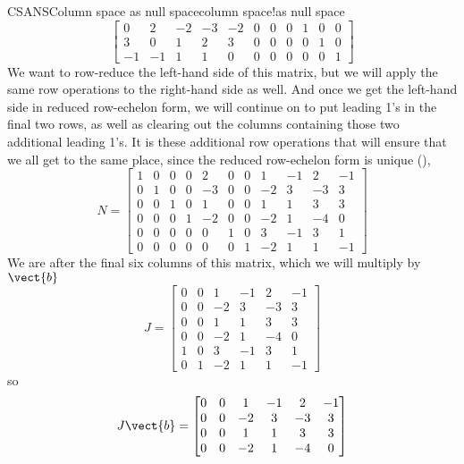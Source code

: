 \begin{example}{CSANS}{Column space as null space}{column space!as null space}
\begin{equation*}
\begin{bmatrix}
 0 & 2 & -2 & -3 & -2 & 0 & 0 & 0 & 1 & 0 & 0 \\
 3 & 0 & 1 & 2 & 3 & 0 & 0 & 0 & 0 & 1 & 0 \\
 -1 & -1 & 1 & 1 & 0 & 0 & 0 & 0 & 0 & 0 & 1
\end{bmatrix}
\end{equation*}
%
We want to row-reduce the left-hand side of this matrix, but we will apply the same row operations to the right-hand side as well.  And once we get the left-hand side in reduced row-echelon form, we will continue on to put leading 1's in the final two rows, as well as clearing out the columns containing those two additional leading 1's.  It is these additional row operations that will ensure that we all get to the same place, since the reduced row-echelon form is unique (),
%
\begin{equation*}
N=
\begin{bmatrix}
 1 & 0 & 0 & 0 & 2 & 0 & 0 & 1 & -1 & 2 & -1 \\
 0 & 1 & 0 & 0 & -3 & 0 & 0 & -2 & 3 & -3 & 3 \\
 0 & 0 & 1 & 0 & 1 & 0 & 0 & 1 & 1 & 3 & 3 \\
 0 & 0 & 0 & 1 & -2 & 0 & 0 & -2 & 1 & -4 & 0 \\
 0 & 0 & 0 & 0 & 0 & 1 & 0 & 3 & -1 & 3 & 1 \\
 0 & 0 & 0 & 0 & 0 & 0 & 1 & -2 & 1 & 1 & -1
\end{bmatrix}
\end{equation*}
%
We are after the final six columns of this matrix, which we will multiply by $\vect{b}$
%
\begin{equation*}
J=
\begin{bmatrix}
 0 & 0 & 1 & -1 & 2 & -1 \\
0 & 0 & -2 & 3 & -3 & 3 \\
0 & 0 & 1 & 1 & 3 & 3 \\
0 & 0 & -2 & 1 & -4 & 0 \\
1 & 0 & 3 & -1 & 3 & 1 \\
0 & 1 & -2 & 1 & 1 & -1
\end{bmatrix}
\end{equation*}
%
so
%
\begin{equation*}
J\vect{b}=
\begin{bmatrix}
0 & 0 & 1 & -1 & 2 & -1 \\
0 & 0 & -2 & 3 & -3 & 3 \\
0 & 0 & 1 & 1 & 3 & 3 \\
0 & 0 & -2 & 1 & -4 & 0 \\

\end{bmatrix}
\end{equation*}
\end{example}
